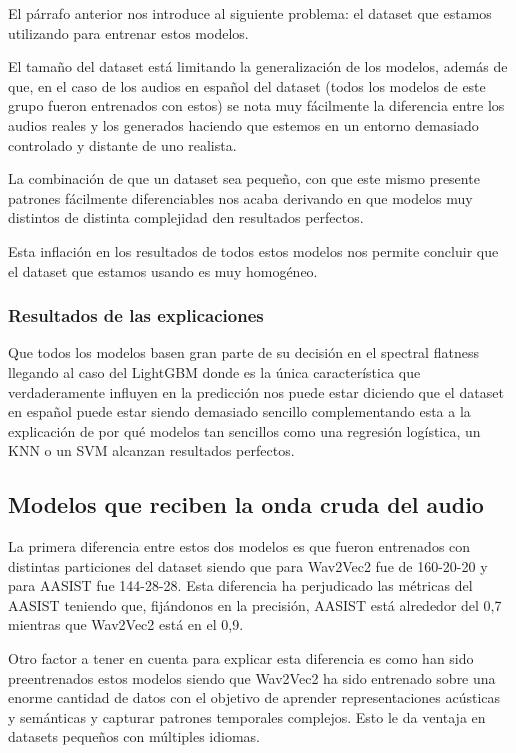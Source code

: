 El párrafo anterior nos introduce al siguiente problema: el dataset que estamos utilizando para entrenar estos modelos.

El tamaño del dataset está limitando la generalización de los modelos, además de que, en el caso de los audios en español del dataset (todos los modelos de este grupo fueron entrenados con estos) se nota muy fácilmente la diferencia entre los audios reales y los generados haciendo que estemos en un entorno demasiado controlado y distante de uno realista. 

La combinación de que un dataset sea pequeño, con que este mismo presente patrones fácilmente diferenciables nos acaba derivando en que modelos muy distintos de distinta complejidad den resultados perfectos. 

Esta inflación en los resultados de todos estos modelos nos permite concluir que el dataset que estamos usando es muy homogéneo.

\subsubsection*{Resultados de las explicaciones}

Que todos los modelos basen gran parte de su decisión en el spectral flatness llegando al caso del LightGBM donde es la única característica que verdaderamente influyen en la predicción nos puede estar diciendo que el dataset en español puede estar siendo demasiado sencillo complementando esta a la explicación de por qué modelos tan sencillos como una regresión logística, un KNN o un SVM alcanzan resultados perfectos.

\subsection*{Modelos que reciben la onda cruda del audio}

La primera diferencia entre estos dos modelos es que fueron entrenados con distintas particiones del dataset siendo que para Wav2Vec2 fue de 160-20-20 y para AASIST fue 144-28-28. Esta diferencia ha perjudicado las métricas del AASIST teniendo que, fijándonos en la precisión, AASIST está alrededor del 0,7 mientras que Wav2Vec2 está en el 0,9.

Otro factor a tener en cuenta para explicar esta diferencia es como han sido preentrenados estos modelos siendo que Wav2Vec2 ha sido entrenado sobre una enorme cantidad de datos con el objetivo de aprender representaciones acústicas y semánticas y capturar patrones temporales complejos. Esto le da ventaja en datasets pequeños con múltiples idiomas.

